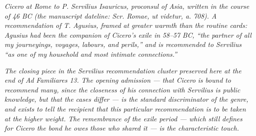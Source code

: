 
\textit{Cicero at Rome to P. Servilius Isauricus, proconsul of
Asia, written in the course of 46 BC (the manuscript dateline:
\textit{Scr. Romae, ut videtur, a. 708}). A recommendation of
T. Agusius, framed at greater warmth than the routine cards:
Agusius had been the companion of Cicero's exile in 58--57 BC,
``the partner of all my journeyings, voyages, labours, and
perils,'' and is recommended to Servilius ``as one of my
household and most intimate connections.''}

\textit{The closing piece in the Servilius recommendation cluster
preserved here at the end of \textit{Ad Familiares} 13. The
opening admission --- that Cicero is bound to recommend many,
since the closeness of his connection with Servilius is public
knowledge, but that the cases differ --- is the standard
discriminator of the genre, and exists to tell the recipient that
this particular recommendation is to be taken at the higher
weight. The remembrance of the exile period --- which still
defines for Cicero the bond he owes those who shared it --- is the
characteristic touch.}
